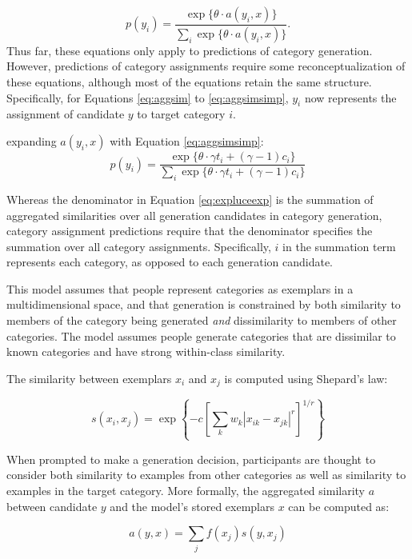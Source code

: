 \documentclass[12pt]{article} \usepackage[letterpaper, margin=1in, headheight=15pt]{geometry}
\begin{document}
\begin{equation} p(y_i) = \dfrac{\exp \{\theta \cdot a(y_i, x)\}} {\sum_i{\exp \{\theta \cdot
a(y_i,x)\}}} .
\end{equation} 
Thus far, these equations only apply to predictions of category generation. However, predictions of
category assignments require some reconceptualization of these equations, although most of the
equations retain the same structure. Specifically, for Equations \ref{eq:aggsim} to
\ref{eq:aggsimsimp}, $y_i$ now represents the assignment of candidate $y$ to target category $i$. 


expanding $a(y_i,x)$ with Equation \ref{eq:aggsimsimp}:
\begin{equation} p(y_i) = \dfrac{\exp \{\theta \cdot \gamma t_i + (\gamma-1) c_i\}} {\sum_i {\exp
      \{\theta \cdot \gamma t_i + (\gamma-1) c_i\}}}
\label{eq:expluceexp}
\end{equation}


Whereas the denominator in Equation \ref{eq:expluceexp} is the summation of aggregated similarities
over all generation candidates in category generation, category assignment predictions require that
the denominator specifies the summation over all category assignments. Specifically, $i$ in the
summation term represents each category, as opposed to each generation candidate.

This model assumes that people represent categories as exemplars in a multidimensional space, and
that generation is constrained by both similarity to members of the category being generated
\textit{and} dissimilarity to members of other categories. The model assumes people generate
categories that are dissimilar to known categories and have strong within-class similarity.

The similarity between exemplars $x_i$ and $x_j$ is computed using Shepard's law:

\begin{equation} s\left(x_i,x_j\right) = \exp \left\{ -c \left[\sum_{k}{ w_k \left| x_{ik} - x_{jk}
\right|^r }\right]^{1/r} \right\}
\label{eq:similarity}
\end{equation}

When prompted to make a generation decision, participants are thought to consider both similarity to
examples from other categories as well as similarity to examples in the target category. More
formally, the aggregated similarity $a$ between candidate $y$ and the model's stored exemplars $x$
can be computed as:

\begin{equation} a(y, x) = \sum_j{f(x_j) s(y, x_j)}
\end{equation}
\end{document}

